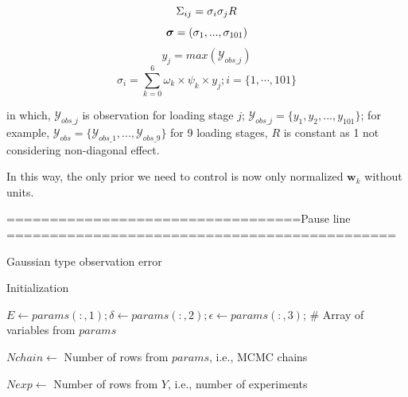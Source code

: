 \documentclass[12pt]{article}%
\theoremstyle{thmstyleone}%
\theoremstyle{thmstyletwo}%
\theoremstyle{thmstylethree}%
\begin{document}
\begin{equation}
        \Sigma_{ij} = \sigma_{i}\sigma_{j}R \\
        \end{equation}
        \begin{equation}
           \boldsymbol{\sigma} = (\sigma_1,...,\sigma_{101}) \\ 
        \end{equation}
\begin{equation}
    y_{j} = max(\mathcal{Y}_{obs\_j})
\end{equation}
        \begin{equation}
\sigma_{i} = \sum_{k=0}^{6} \omega_{k} \times \psi_{k} \times y_{j}; i = \{1,\cdots,101\}
        \end{equation}

in which, $\mathcal{Y}_{obs\_j}$ is observation for  loading stage  $j$; $\mathcal{Y}_{obs\_j} = \{ y_1,y_2,...,y_{101}\}$; for example, $\mathcal{Y}_{obs} = \{\mathcal{Y}_{obs\_1},...,\mathcal{Y}_{obs\_9}  \}$ for 9 loading stages, $R$ is constant as 1 not considering non-diagonal effect.

In this way, the only prior we need to control is now only normalized $\boldsymbol{w}_{k}$ without units.

==================================Pause line =============================================
\begin{algorithm}
    \caption{Gaussian type observation error} \label{alg:loglikelihood}


Initialization\; 

$E \gets params(:,1); \delta \gets params(:,2); \epsilon \gets params(:,3)$; \# Array of variables from $params$ \; 

$Nchain \gets$ Number of rows from $params$, i.e., MCMC chains \; 

$Nexp \gets$  Number of rows from $Y$, i.e., number of experiments \; 


\end{algorithm}
\end{document}
